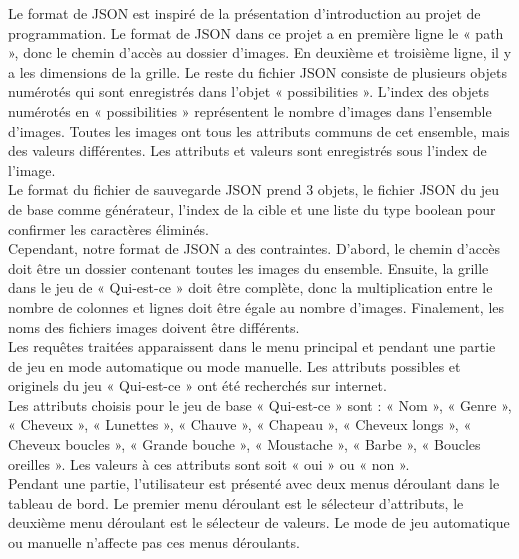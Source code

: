 \documentclass[a4paper]{article}
\begin{document}
Le format de JSON est inspiré de la présentation d’introduction au projet de programmation.  Le format de JSON dans ce projet a en première ligne le « path », donc le chemin d’accès au dossier d’images. En deuxième et troisième ligne, il y a les dimensions de la grille. Le reste du fichier JSON consiste de plusieurs objets numérotés qui sont enregistrés dans l’objet « possibilities ». L’index des objets numérotés en « possibilities » représentent le nombre d'images dans l’ensemble d’images. Toutes les images ont tous les attributs communs de cet ensemble, mais des valeurs différentes. Les attributs et valeurs sont enregistrés sous l’index de l’image.\\
Le format du fichier de sauvegarde JSON prend 3 objets, le fichier JSON du jeu de base comme générateur, l’index de la cible et une liste du type boolean pour confirmer les caractères éliminés.\\
Cependant, notre format de JSON a des contraintes. D’abord, le chemin d’accès doit être un dossier contenant toutes les images du ensemble. Ensuite, la grille dans le jeu de « Qui-est-ce » doit être complète, donc la multiplication entre le nombre de colonnes et lignes doit être égale au nombre d’images. Finalement, les noms des fichiers images doivent être différents.\\

Les requêtes traitées apparaissent dans le menu principal et pendant une partie de jeu en mode automatique ou mode manuelle. Les attributs possibles et originels du jeu « Qui-est-ce » ont été recherchés sur internet. \\
Les attributs choisis pour le jeu de base « Qui-est-ce » sont : « Nom », « Genre », « Cheveux », « Lunettes », « Chauve », « Chapeau », « Cheveux longs », « Cheveux boucles », « Grande bouche », « Moustache », « Barbe », « Boucles oreilles ». Les valeurs à ces attributs sont soit « oui » ou « non ».\\

Pendant une partie, l’utilisateur est présenté avec deux menus déroulant dans le tableau de bord. Le premier menu déroulant est le sélecteur d’attributs, le deuxième menu déroulant est le sélecteur de valeurs. Le mode de jeu automatique ou manuelle n’affecte pas ces menus déroulants.\\
\end{document}
